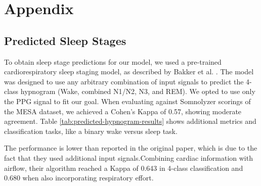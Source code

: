 \chapter{Appendix \label{Chapter-Appendix}}

\section{Predicted Sleep Stages\label{Apx-Pred-Hypnogram}}

To obtain sleep stage predictions for our model, we used a pre-trained cardiorespiratory sleep staging model, as described by Bakker et al. \cite{bakker2021estimating}. The model was designed to use any arbitrary combination of input signals to predict the 4-class hypnogram (Wake, combined N1/N2, N3, and REM). We opted to use only the PPG signal to fit our goal. When evaluating against Somnolyzer scorings of the MESA dataset, we achieved a Cohen's Kappa of 0.57, showing moderate agreement. Table \ref{tab:predicted-hypnogram-results} shows additional metrics and classification tasks, like a binary wake versus sleep task.

The performance is lower than reported in the original paper, which is due to the fact that they used additional input signals.Combining cardiac information with airflow, their algorithm reached a Kappa of 0.643 in 4-class classification and 0.680 when also incorporating respiratory effort.


